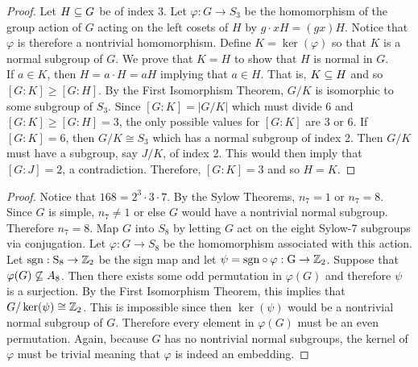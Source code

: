\documentclass[../../AlgebraQualSolutions.tex]{subfiles}
\begin{document}
\begin{proof}
    Let $H \subseteq G$ be of index 3. Let $\varphi: G \to S_3$ be the homomorphism of the group action of $G$ acting on the left cosets of $H$ by $g\cdot xH = (gx)H$. Notice that $\varphi$ is therefore a nontrivial homomorphism. Define $K = \ker(\varphi)$ so that $K$ is a normal subgroup of $G$. We prove that $K = H$ to show that $H$ is normal in $G$.\\

    If $a \in K$, then $H = a\cdot H = aH$ implying that $a \in H$. That is, $K \subseteq H$ and so $[G:K] \geq [G:H]$. By the First Isomorphism Theorem, $G/K$ is isomorphic to some subgroup of $S_3$. Since $[G:K] = |G/K|$ which must divide 6 and $[G:K] \geq [G:H] = 3$, the only possible values for $[G:K]$ are 3 or 6. If $[G:K] =6$, then $G/K \cong S_3$ which has a normal subgroup of index 2. Then $G/K$ must have a subgroup, say $J/K$, of index 2. This would then imply that $[G:J] =2$, a contradiction. Therefore, $[G:K] = 3$ and so $H = K$.
\end{proof}

\begin{proof}
    Notice that $168 = 2^3 \cdot 3 \cdot 7$. By the Sylow Theorems, $n_7 = 1$ or $n_7 = 8$. Since $G$ is simple, $n_7 \neq 1$ or else $G$ would have a nontrivial normal subgroup. Therefore $n_7 = 8$. Map $G$ into $S_8$ by letting $G$ act on the eight Sylow-7 subgroups via conjugation. Let $\varphi: G \to S_8$ be the homomorphism associated with this action. Let $\rm{sgn}: S_8 \to \mathbb{Z}_2$ be the sign map and let $\psi = \rm{sgn}\circ \varphi: G \to \mathbb{Z}_2$. Suppose that $\varphi(G) \not\subseteq A_8$. Then there exists some odd permutation in $\varphi(G)$ and therefore $\psi$ is a surjection. By the First Isomorphism Theorem, this implies that $G/\ker(\psi) \cong \mathbb{Z}_2$. This is impossible since then $\ker(\psi)$ would be a nontrivial normal subgroup of $G$. Therefore every element in $\varphi(G)$ must be an even permutation. Again, because $G$ has no nontrivial normal subgroups, the kernel of $\varphi$ must be trivial meaning that $\varphi$ is indeed an embedding.
\end{proof}
\end{document}
